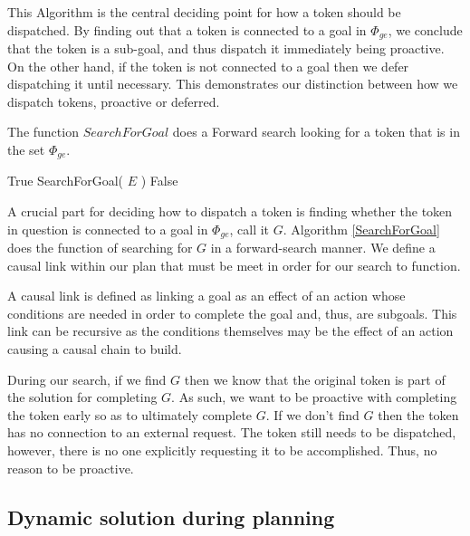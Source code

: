 This Algorithm is the central deciding point for how a
token should be dispatched. By finding out that a token is connected
to a goal in $\Phi_{ge}$, we conclude that the token is a sub-goal,
and thus dispatch it immediately being proactive.  On the other hand,
if the token is not connected to a goal then we defer dispatching it
until necessary.  This demonstrates our distinction between how we
dispatch tokens, proactive or deferred.

\begin{algorithm}
\caption{The function $SearchForGoal$ does a Forward search looking for a token that is
in the set $\Phi_{ge}$.}
\label{SearchForGoal}
\begin{algorithmic}
			\State \Return True
			\State \Return SearchForGoal( $E$ )
		\Else 
			\State \Return False
		\EndIf
	\EndFor
\EndFor
\EndFunction
\end{algorithmic}
\end{algorithm}

A crucial part for deciding how to dispatch a token is finding whether the token in question is 
connected to a goal in $\Phi_{ge}$, call it $G$. Algorithm \ref{SearchForGoal} does the function of 
searching for $G$ in a forward-search manner. We define a causal link within our plan that must be
meet in order for our search to function. 
\begin{definition}
\label{def:subgoalLink}
A causal link is defined as linking a goal as an effect of an action whose conditions are needed in order
to complete the goal and, thus, are subgoals. This link can be recursive as the conditions themselves 
may be the effect of an action causing a causal chain to build.
\end{definition}
During our search, if we find $G$ then we know that the original token
is part of the solution for completing $G$.  As such, we want to be
proactive with completing the token early so as to ultimately complete
$G$. If we don't find $G$ then the token has no connection to an
external request. The token still needs to be dispatched, however,
there is no one explicitly requesting it to be accomplished. Thus, no
reason to be proactive.

\subsection{Dynamic solution during planning}


